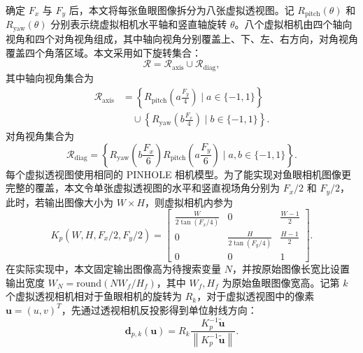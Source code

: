 确定 \(F_x\) 与 \(F_y\) 后，本文将每张鱼眼图像拆分为八张虚拟透视图。记 \(R_{\mathrm{pitch}}(\theta)\) 和 \(R_{\mathrm{yaw}}(\theta)\) 分别表示绕虚拟相机水平轴和竖直轴旋转 \(\theta\)。八个虚拟相机由四个轴向视角和四个对角视角组成，其中轴向视角分别覆盖上、下、左、右方向，对角视角覆盖四个角落区域。本文采用如下旋转集合：
\begin{equation}
    \label{equ:method-eight-view-rotations}
    \mathcal{R}
    =
    \mathcal{R}_{\mathrm{axis}}
    \cup
    \mathcal{R}_{\mathrm{diag}},
\end{equation}
其中轴向视角集合为
\begin{equation}
    \label{equ:method-eight-view-axis}
    \begin{array}{rl}
    \mathcal{R}_{\mathrm{axis}}
    &=
    \left\{
    R_{\mathrm{pitch}}\!\left(a\frac{F_y}{4}\right)
    \mid a\in\{-1,1\}
    \right\}
    \\
    &\quad{}\cup
    \left\{
    R_{\mathrm{yaw}}\!\left(b\frac{F_x}{4}\right)
    \mid b\in\{-1,1\}
    \right\}.
    \end{array}
\end{equation}
对角视角集合为
\begin{equation}
    \label{equ:method-eight-view-diag}
    \mathcal{R}_{\mathrm{diag}}
    =
    \left\{
    R_{\mathrm{yaw}}\!\left(b\frac{F_x}{6}\right)
    R_{\mathrm{pitch}}\!\left(a\frac{F_y}{6}\right)
    \mid a,b\in\{-1,1\}
    \right\}.
\end{equation}
每个虚拟透视图使用相同的 PINHOLE 相机模型。为了能实现对鱼眼相机图像更完整的覆盖，本文令单张虚拟透视图的水平和竖直视场角分别为 \(F_x/2\) 和 \(F_y/2\)，此时，若输出图像大小为 \(W\times H\)，则虚拟相机内参为
\begin{equation}
    \label{equ:method-perspective-k-xy}
    K_p(W,H,F_x/2,F_y/2)
    =
    \left[
    \begin{array}{ccc}
        \frac{W}{2\tan(F_x/4)} & 0 & \frac{W-1}{2} \\
        0 & \frac{H}{2\tan(F_y/4)} & \frac{H-1}{2} \\
        0 & 0 & 1
    \end{array}
    \right].
\end{equation}
在实际实现中，本文固定输出图像高为待搜索变量 \(N\)，并按原始图像长宽比设置输出宽度 \(W_N=\mathrm{round}(N W_f/H_f)\)，其中 \(W_f,H_f\) 为原始鱼眼图像宽高。记第 \(k\) 个虚拟透视相机相对于鱼眼相机的旋转为 \(R_k\)，对于虚拟透视图中的像素 \(\mathbf{u}=(u,v)^{T}\)，先通过透视相机反投影得到单位射线方向：
\begin{equation}
    \label{equ:method-virtual-view-ray}
    \mathbf{d}_{p,k}(\mathbf{u})
    =
    R_k
    \frac{K_p^{-1}\tilde{\mathbf{u}}}
    {\left\|K_p^{-1}\tilde{\mathbf{u}}\right\|}.
\end{equation}
